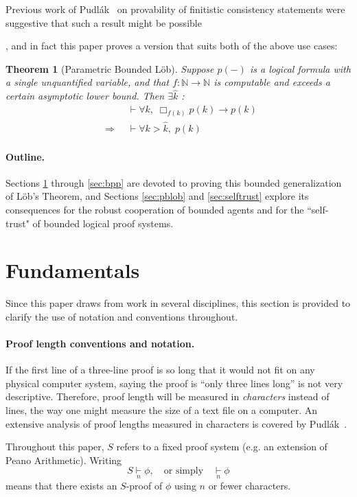 \documentclass[onecolumn]{miri-tech-article}
\newcommand{\bred}[1]{{\color{red}{#1}}}
\newtheorem*{theorem*}{Theorem}
\numberwithin{equation}{section}
\theoremstyle{definition}
\newcommand{\NN}{\mathbb{N}}
\newcommand{\proves}[1]{\underset{#1}{\vdash}}
\newcommand{\bx}[1]{\Box_{#1}}
\renewcommand{\implies}{\rightarrow}
\renewcommand{\to}{\rightarrow}
\newcommand{\Implies}{\;\;\Rightarrow\;\;}
\renewcommand{\-}{^{-1}}
\begin{document}
Previous work of Pudl\'{a}k~\cite{Pudlak:1998} on provability of finitistic consistency statements were suggestive that such a result might be possible

\bred{elaborate}, and in fact this paper proves a version that suits both of the above use cases:

\begin{theorem*}[Parametric Bounded L\"{o}b]
Suppose $p(-)$ is a logical formula with a single unquantified variable, and that $f:\NN \to \NN$ is computable and  exceeds a certain asymptotic lower bound.  Then $\exists\hat k$ :
\begin{align*}
             &\proves{} \forall k,\; \bx{f(k)}p(k) \implies p(k)\\
\Implies &\proves{} \forall k>\hat k, \; p(k)
\end{align*}
\end{theorem*}

\paragraph{Outline.} Sections \ref{sec:fund} through \ref{sec:bpp} are devoted to proving this bounded generalization of L\"{o}b's Theorem, and Sections \ref{sec:pblob} and \ref{sec:selftrust} explore its consequences for the robust cooperation of bounded agents and for the ``self-trust" of bounded logical proof systems.

\section{Fundamentals}\label{sec:fund}

Since this paper draws from work in several disciplines, this section is provided to clarify the use of notation and conventions throughout.

\paragraph{Proof length conventions and notation.}
If the first line of a three-line proof is so long that it would not fit on any physical computer system, saying the proof is ``only three lines long'' is not very descriptive.  Therefore, proof length will be measured in {\em characters} instead of lines, the way one might measure the size of a text file on a computer.  An extensive analysis of proof lengths measured in characters is covered by Pudl\'{a}k~\cite{Pudlak:1998}.

Throughout this paper, $S$ refers to a fixed proof system (e.g. an extension of Peano Arithmetic).  Writing
$$S \proves{n} \phi, \quad \text{or simply} \quad \proves{n} \phi$$
means that there exists an $S$-proof of $\phi$ using $n$ or fewer characters.  
\end{document}

